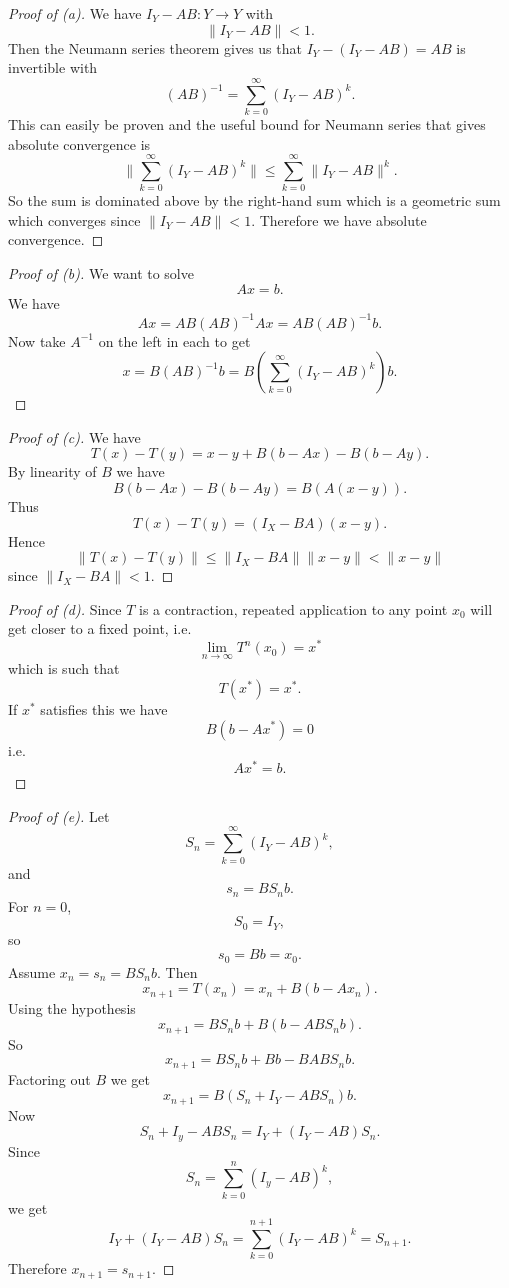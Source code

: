 \begin{proof}[Proof of (a)]
    We have $I_Y - AB : Y \to Y$ with 
    \[
        \|I_Y - AB\| < 1. 
    \]
    Then the Neumann series theorem gives us 
    that $I_Y - (I_Y - AB) = AB$ is invertible with 
    \[
        (AB)^{-1} = \sum_{k=0}^\infty (I_Y - AB)^k. 
    \]
    This can easily be proven and the useful bound for 
    Neumann series that gives absolute convergence is 
    \[
        \|\sum_{k=0}^\infty (I_Y - AB)^k\|  
        \leq 
        \sum_{k=0}^\infty \|I_Y - AB\|^k. 
    \]
    So the sum is dominated above by the right-hand sum 
    which is a geometric sum which converges since 
    $\|I_Y - AB\| < 1$. Therefore we have absolute convergence. 
\end{proof}
\begin{proof}[Proof of (b)]
    We want to solve 
    \[
        Ax = b. 
    \]
    We have 
    \[
        Ax = AB(AB)^{-1}Ax = AB(AB)^{-1}b. 
    \]
    Now take $A^{-1}$ on the left in each to get 
    \[
        x = B(AB)^{-1}b = B\left(\sum_{k=0}^\infty 
        (I_Y - AB)^k\right)b.
    \]
\end{proof}
\begin{proof}[Proof of (c)]
    We have 
    \[
        T(x) - T(y) = x-y + B(b-Ax) - B(b-Ay). 
    \]
    By linearity of $B$ we have 
    \[
        B(b-Ax) - B(b-Ay) = B(A(x-y)). 
    \]
    Thus 
    \[
        T(x)-T(y) = (I_X - BA)(x-y). 
    \]
    Hence
    \[
        \|T(x) - T(y)\| \leq \|I_X - BA\|\|x-y\| < \|x-y\|
    \]
    since $\|I_X - BA\| < 1$.
\end{proof}
\begin{proof}[Proof of (d)]
    Since $T$ is a contraction, repeated application to any 
    point $x_0$ will get closer to a fixed point, i.e. 
    \[
        \lim_{n\to\infty} T^n(x_0) = x^*
    \]
    which is such that 
    \[
        T(x^*) = x^*. 
    \]
    If $x^*$ satisfies this we have 
    \[
        B(b - Ax^*) = 0 
    \]
    i.e. 
    \[
        Ax^* = b. 
    \]
\end{proof}

\begin{proof}[Proof of (e)]
    Let 
    \[
        S_n = \sum_{k=0}^\infty (I_Y - AB)^k, 
    \]
    and 
    \[
        s_n = BS_nb. 
    \]
    For $n = 0$, 
    \[
        S_0 = I_Y, 
    \]
    so 
    \[
        s_0 = Bb = x_0. 
    \]
    Assume $x_n = s_n = BS_nb$. 
    Then 
    \[
        x_{n+1} = T(x_n) = x_n + B(b-Ax_n). 
    \]
    Using the hypothesis 
    \[
        x_{n+1} = BS_nb + B(b-ABS_n b). 
    \]
    So  
    \[
        x_{n+1} = BS_nb + Bb - BABS_nb. 
    \]
    Factoring out $B$ we get 
    \[
        x_{n+1} = B(S_n + I_Y - ABS_n)b. 
    \]
    Now \[
        S_n + I_y - ABS_n = I_Y + (I_Y - AB)S_n. 
    \]
    Since 
    \[
        S_n = \sum_{k=0}^n (I_y - AB)^k, 
    \]
    we get 
    \[
        I_Y + (I_Y - AB)S_n = \sum_{k=0}^{n+1}(I_Y - AB)^k 
        = S_{n+1}. 
    \]
    Therefore $x_{n+1} = s_{n+1}$. 
\end{proof}

